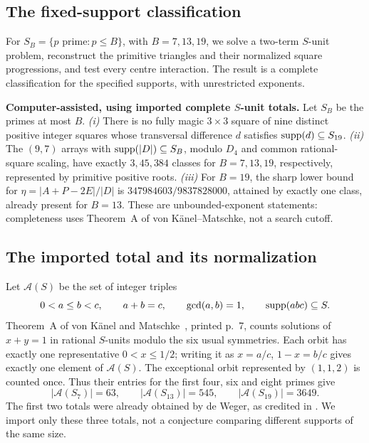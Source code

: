 \subsection{The fixed-support classification}

For $S_B=\{p\text{ prime}:p\le B\}$, with $B=7,13,19$, we solve a
two-term $S$-unit problem, reconstruct the primitive triangles and their
normalized square progressions, and test every centre interaction.
The result is a complete classification for the specified supports,
with unrestricted exponents.

\begin{theorem}\label{main:smoothsupport}
\textbf{Computer-assisted, using imported complete $S$-unit totals.}
Let $S_B$ be the primes at most $B$. \emph{(i)} There is no fully magic
$3\times3$ square of nine distinct positive integer squares whose
transversal difference $d$ satisfies $\operatorname{supp}(d)\subseteq S_{19}$.
\emph{(ii)} The $(9,7)$ arrays with $\operatorname{supp}(|D|)\subseteq S_B$, modulo
$D_4$ and common rational-square scaling, have exactly $3,45,384$ classes
for $B=7,13,19$, respectively, represented by primitive positive roots.
\emph{(iii)} For $B=19$, the sharp lower bound for
$\eta=|A+P-2E|/|D|$ is $347984603/9837828000$, attained by exactly one
class, already present for $B=13$. These are unbounded-exponent statements:
completeness uses Theorem~A of von K\"anel--Matschke, not a search cutoff.
\end{theorem}

\subsection{The imported total and its normalization}

Let $\mathcal A(S)$ be the set of integer triples
\[
0<a\le b<c,\qquad a+b=c,\qquad \gcd(a,b)=1,
\qquad \operatorname{supp}(abc)\subseteq S.
\]
Theorem~A of von K\"anel and Matschke~\cite{VKM16}, printed p.~7,
counts solutions of $x+y=1$ in rational $S$-units modulo the six usual
symmetries. Each orbit has exactly one representative $0<x\le1/2$;
writing it as $x=a/c$, $1-x=b/c$ gives exactly one element of
$\mathcal A(S)$. The exceptional orbit represented by $(1,1,2)$ is counted
once. Thus their entries for the first four, six and eight primes give
\[
|\mathcal A(S_7)|=63,\qquad |\mathcal A(S_{13})|=545,\qquad
|\mathcal A(S_{19})|=3649.
\]
The first two totals were already obtained by de Weger, as credited in
\cite{VKM16}. We import only these three totals, not a conjecture comparing
different supports of the same size.


